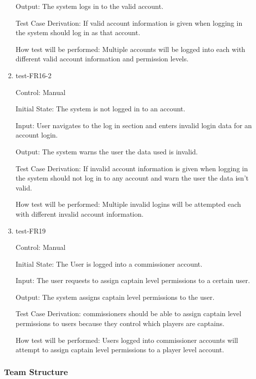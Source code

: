 \documentclass[12pt, titlepage]{article}
\begin{document}
\begin{enumerate}
  Output: The system logs in to the valid account.
  
  Test Case Derivation: If valid account information is given when logging in
  the system should log in as that account.
  
  How test will be performed: Multiple accounts will be logged into each with
  different valid account information and permission levels.

  \item{test-FR16-2\\}

  Control: Manual
            
  Initial State: The system is not logged in to an account.
            
  Input: User navigates to the log in section and enters invalid login data
  for an account login.
            
  Output: The system warns the user the data used is invalid.
  
  Test Case Derivation: If invalid account information is given when logging
  in the system should not log in to any account and warn the user the data
  isn't valid.
  
  How test will be performed: Multiple invalid logins will be attempted each
  with different invalid account information.

  \item{test-FR19\\}

  Control: Manual
           
  Initial State: The User is logged into a commissioner account.
           
  Input: The user requests to assign captain level permissions to a 
  certain user.
           
  Output: The system assigns captain level permissions to the user.
 
  Test Case Derivation: commissioners should be able to assign captain level
  permissions to users because they control which players are captains.
 
  How test will be performed: Users logged into commissioner accounts will attempt
  to assign captain level permissions to a player level account.

\end{enumerate}

\subsubsection{Team Structure}
\end{document}
